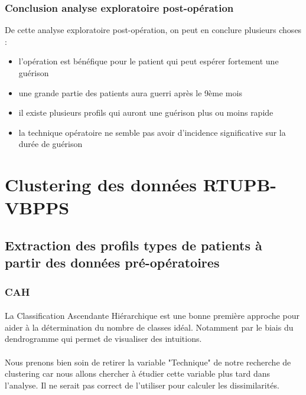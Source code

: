 \documentclass[11pt]{article}
\providecommand{\tightlist}{%
      \setlength{\itemsep}{0pt}\setlength{\parskip}{0pt}}
\begin{document}
    \subsubsection{Conclusion analyse exploratoire post-opération}\label{conclusion-analyse-exploratoire-post-opuxe9ration}

    De cette analyse exploratoire post-opération, on peut en conclure
plusieurs choses : 
\begin{itemize}
\tightlist
\item l'opération est bénéfique pour le patient qui peut
espérer fortement une guérison
\item une grande partie des patients aura
guerri après le 9ème mois
\item il existe plusieurs profils qui auront une
guérison plus ou moins rapide
\item la technique opératoire ne semble pas
avoir d'incidence significative sur la durée de guérison
\end{itemize}

    \section{Clustering des données
RTUPB-VBPPS}\label{clustering-des-donnuxe9es-rtupb-vbpps}

    \subsection{Extraction des profils types de patients à partir des
données
pré-opératoires}\label{extraction-des-profils-types-de-patients-uxe0-partir-des-donnuxe9es-pruxe9-opuxe9ratoires}

    \subsubsection{CAH}\label{cah}

\paragraph{}
La Classification Ascendante Hiérarchique est une bonne première
approche pour aider à la détermination du nombre de classes idéal.
Notamment par le biais du dendrogramme qui permet de visualiser des
intuitions.
\paragraph{}
Nous prenons bien soin de retirer la variable "Technique" de notre
recherche de clustering car nous allons chercher à étudier cette
variable plus tard dans l'analyse. Il ne serait pas correct de
l'utiliser pour calculer les dissimilarités.
\end{document}
